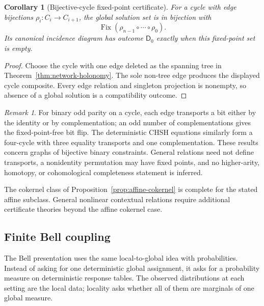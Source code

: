 \documentclass[11pt]{article}
\theoremstyle{plain}
\newtheorem{corollary}[theorem]{Corollary}
\theoremstyle{definition}
\theoremstyle{remark}
\newtheorem{remark}[theorem]{Remark}
\begin{document}
\begin{corollary}[Bijective-cycle fixed-point certificate]
\label{cor:cycle-holonomy}
For a cycle with edge bijections
$\rho_i:C_i\to C_{i+1}$, the global solution set is in bijection with
\[
\operatorname{Fix}(\rho_{n-1}\circ\cdots\circ\rho_0).
\]
Its canonical incidence diagram has outcome $\mathsf D_0$ exactly when this
fixed-point set is empty.
\end{corollary}

\begin{proof}
Choose the cycle with one edge deleted as the spanning tree in
Theorem~\ref{thm:network-holonomy}. The sole non-tree edge produces the displayed
cycle composite. Every edge relation and singleton projection is nonempty, so
absence of a global solution is a compatibility outcome.
\end{proof}

\begin{remark}
For binary odd parity on a cycle, each edge transports a bit either by the
identity or by complementation; an odd number of complementations gives the
fixed-point-free bit flip. The deterministic CHSH equations similarly form a
four-cycle with three equality transports and one complementation. These results
concern graphs of bijective binary constraints. General relations need not
define transports, a nonidentity permutation may have fixed points, and no
higher-arity, homotopy, or cohomological completeness statement is inferred.
\end{remark}

The cokernel class of Proposition~\ref{prop:affine-cokernel} is complete for the
stated affine subclass. General nonlinear contextual relations require
additional certificate theories beyond the affine cokernel case.

\subsection{Finite Bell coupling}

The Bell presentation uses the same local-to-global idea with probabilities.
Instead of asking for one deterministic global assignment, it asks for a
probability measure on deterministic response tables. The observed distributions
at each setting are the local data; locality asks whether all of them are
marginals of one global measure.
\end{document}
